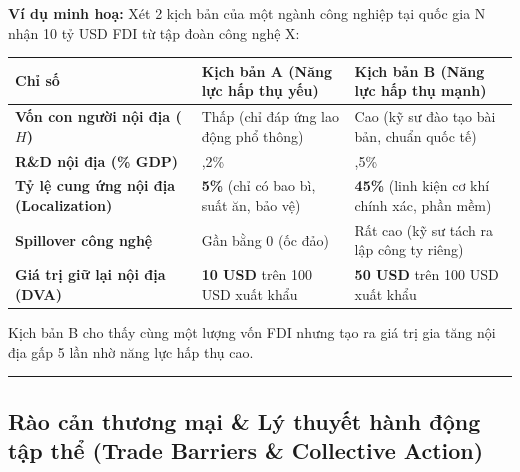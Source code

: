 \documentclass[
]{article}
\newcounter{none} %
\begin{document}
\textbf{Ví dụ minh hoạ:} Xét 2 kịch bản của một ngành công nghiệp tại
quốc gia N nhận 10 tỷ USD FDI từ tập đoàn công nghệ X:

{\def\LTcaptype{none} %
\begin{longtable}[]{@{}
  >{\raggedright\arraybackslash}p{}
  >{\raggedright\arraybackslash}p{}
  >{\raggedright\arraybackslash}p{}@{}}
\toprule\noalign{}
\begin{minipage}[b]{\linewidth}\raggedright
Chỉ số
\end{minipage} & \begin{minipage}[b]{\linewidth}\raggedright
Kịch bản A (Năng lực hấp thụ yếu)
\end{minipage} & \begin{minipage}[b]{\linewidth}\raggedright
Kịch bản B (Năng lực hấp thụ mạnh)
\end{minipage} \\
\midrule\noalign{}
\endhead
\bottomrule\noalign{}
\endlastfoot
\textbf{Vốn con người nội địa (\(H\))} & Thấp (chỉ đáp ứng lao động phổ
thông) & Cao (kỹ sư đào tạo bài bản, chuẩn quốc tế) \\
\textbf{R\&D nội địa (\% GDP)} & 0,2\% & 1,5\% \\
\textbf{Tỷ lệ cung ứng nội địa (Localization)} & \textbf{5\%} (chỉ có
bao bì, suất ăn, bảo vệ) & \textbf{45\%} (linh kiện cơ khí chính xác,
phần mềm) \\
\textbf{Spillover công nghệ} & Gần bằng 0 (ốc đảo) & Rất cao (kỹ sư tách
ra lập công ty riêng) \\
\textbf{Giá trị giữ lại nội địa (DVA)} & \textbf{10 USD} trên 100 USD
xuất khẩu & \textbf{50 USD} trên 100 USD xuất khẩu \\
\end{longtable}
}

Kịch bản B cho thấy cùng một lượng vốn FDI nhưng tạo ra giá trị gia tăng
nội địa gấp 5 lần nhờ năng lực hấp thụ cao.

\begin{center}\rule{0.5\linewidth}{0.5pt}\end{center}

\subsection{Rào cản thương mại \& Lý thuyết hành động tập thể (Trade
Barriers \& Collective
Action)}\label{ruxe0o-cux1ea3n-thux1b0ux1a1ng-mux1ea1i-luxfd-thuyux1ebft-huxe0nh-ux111ux1ed9ng-tux1eadp-thux1ec3-trade-barriers-collective-action}
\end{document}
